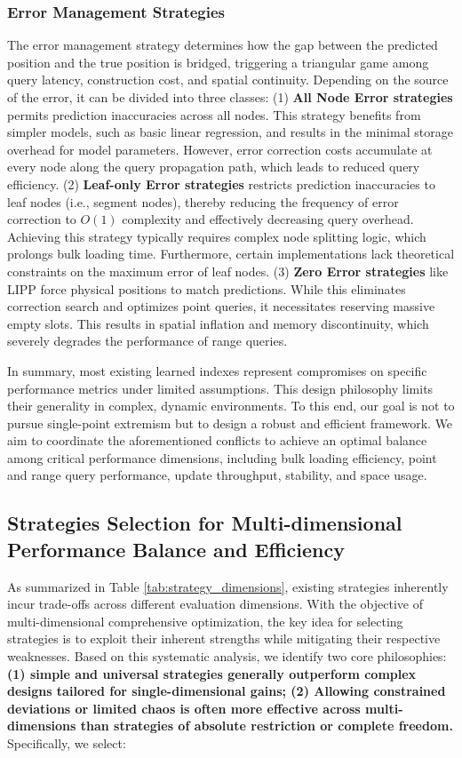 \subsubsection{Error Management Strategies}
The error management strategy determines how the gap between the predicted position and the true position is bridged, triggering a triangular game among query latency, construction cost, and spatial continuity. Depending on the source of the error, it can be divided into three classes: (1) \textbf{All Node Error strategies} \cite{plex21, hlihp24} permits prediction inaccuracies across all nodes. This strategy benefits from simpler models, such as basic linear regression, and results in the minimal storage overhead for model parameters. However, error correction costs accumulate at every node along the query propagation path, which leads to reduced query efficiency. (2) \textbf{Leaf-only Error strategies} \cite{alex20, lits24, alt-index25} restricts prediction inaccuracies to leaf nodes (i.e., segment nodes), thereby reducing the frequency of error correction to $O(1)$ complexity and effectively decreasing query overhead. Achieving this strategy typically requires complex node splitting logic, which prolongs bulk loading time. Furthermore, certain implementations \cite{alex20} lack theoretical constraints on the maximum error of leaf nodes. (3) \textbf{Zero Error strategies} like LIPP \cite{lipp21} force physical positions to match predictions. While this eliminates correction search and optimizes point queries, it necessitates reserving massive empty slots. This results in spatial inflation and memory discontinuity, which severely degrades the performance of range queries.

In summary, most existing learned indexes represent compromises on specific performance metrics under limited assumptions. This design philosophy limits their generality in complex, dynamic environments. To this end, our goal is not to pursue single-point extremism but to design a robust and efficient framework. We aim to coordinate the aforementioned conflicts to achieve an optimal balance among critical performance dimensions, including bulk loading efficiency, point and range query performance, update throughput, stability, and space usage.

\subsection{Strategies Selection for Multi-dimensional Performance Balance and Efficiency}
As summarized in Table \ref{tab:strategy_dimensions}, existing strategies inherently incur trade-offs across different evaluation dimensions. With the objective of multi-dimensional comprehensive optimization, the key idea for selecting strategies is to exploit their inherent strengths while mitigating their respective weaknesses. Based on this systematic analysis, we identify two core philosophies: \textbf{(1) simple and universal strategies generally outperform complex designs tailored for single-dimensional gains; (2) Allowing constrained deviations or limited chaos is often more effective across multi-dimensions than strategies of absolute restriction or complete freedom.} Specifically, we select:

